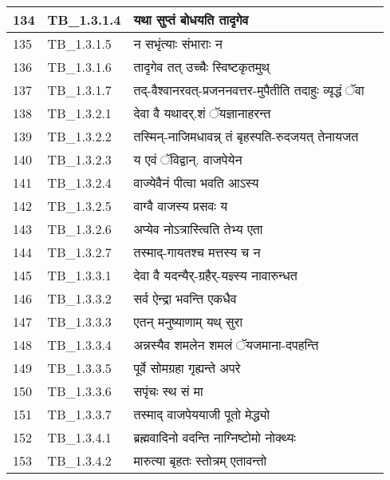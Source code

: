 \documentclass[17pt]{extarticle}
\begin{document}
\begin{longtable}{||p{0.4in}||p{0.9in}||p{4.0in}||p{0.9in}||}
        \hline
            134 & TB\_1.3.1.4 & यथा सुप्तं बोधयति तादृगेव &      \\
        \hline
            135 & TB\_1.3.1.5 & न सभृंत्याः संभाराः न &      \\
        \hline
            136 & TB\_1.3.1.6 & तादृगेव तत् उच्चैः स्विष्टकृतमुथ् &      \\
        \hline
            137 & TB\_1.3.1.7 & तद्{-}वैश्वानरवत्{-}प्रजननवत्तर{-}मुपैतीति तदाहुः व्यृद्धं ॅवा &      \\
        \hline
            138 & TB\_1.3.2.1 & देवा वै यथादर्.शं ॅयज्ञानाहरन्त &      \\
        \hline
            139 & TB\_1.3.2.2 & तस्मिन्{-}नाजिमधावन्न् तं बृहस्पति{-}रुदजयत् तेनायजत &      \\
        \hline
            140 & TB\_1.3.2.3 & य एवं ॅविद्वान्. वाजपेयेन &      \\
        \hline
            141 & TB\_1.3.2.4 & वाज्येवैनं पीत्वा भवति आऽस्य &      \\
        \hline
            142 & TB\_1.3.2.5 & वाग्वै वाजस्य प्रसवः य &      \\
        \hline
            143 & TB\_1.3.2.6 & अप्येव नोऽत्रास्त्विति तेभ्य एता &      \\
        \hline
            144 & TB\_1.3.2.7 & तस्माद्{-}गायतश्च मत्तस्य च न &      \\
        \hline
            145 & TB\_1.3.3.1 & देवा वै यदन्यैर्{-}ग्रहैर्{-}यज्ञ्स्य नावारुन्धत &      \\
        \hline
            146 & TB\_1.3.3.2 & सर्व ऐन्द्रा भवन्ति एकधैव &      \\
        \hline
            147 & TB\_1.3.3.3 & एतन् मनुष्याणाम् यथ् सुरा &      \\
        \hline
            148 & TB\_1.3.3.4 & अन्नस्यैव शमलेन शमलं ॅयजमाना{-}दपहन्ति &      \\
        \hline
            149 & TB\_1.3.3.5 & पूर्वे सोमग्रहा गृह्यन्ते अपरे &      \\
        \hline
            150 & TB\_1.3.3.6 & सपृंचः स्थ सं मा &      \\
        \hline
            151 & TB\_1.3.3.7 & तस्माद् वाजपेययाजी पूतो मेद्ध्यो &      \\
        \hline
            152 & TB\_1.3.4.1 & ब्रह्मवादिनो वदन्ति नाग्निष्टोमो नोक्थ्यः &      \\
        \hline
            153 & TB\_1.3.4.2 & मारुत्या बृहतः स्तोत्रम् एतावन्तो &      \\

\end{longtable}
\end{document}

